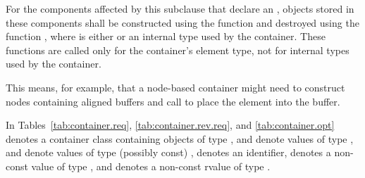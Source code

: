 \pnum
For the components affected by this subclause that declare an ,
objects stored in these components shall be constructed using the function
and destroyed using the function
,
where  is either  or
an internal type used by the container.
These functions are called only for the
container's element type, not for internal types used by the container.
\begin{note}
This
means, for example, that a node-based container might need to construct nodes containing
aligned buffers and call  to place the element into the buffer.
\end{note}

\pnum
In Tables~\ref{tab:container.req},
\ref{tab:container.rev.req}, and
\ref{tab:container.opt}
 denotes a container class containing objects of type ,
 and  denote values of type ,
 and  denote values of type (possibly const) ,
 denotes an identifier,
 denotes a non-const value of type , and
 denotes a non-const rvalue of type .

